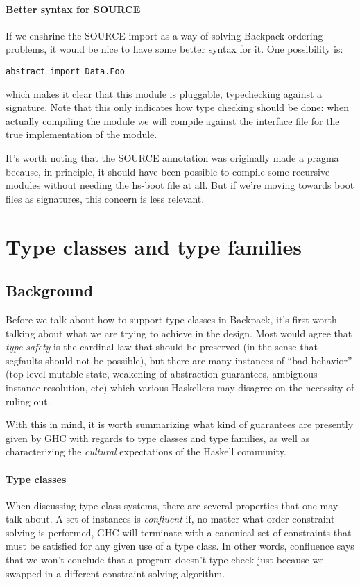 \documentclass{article}
\begin{document}
\paragraph{Better syntax for SOURCE}  If we enshrine the SOURCE import
as a way of solving Backpack ordering problems, it would be nice to have
some better syntax for it. One possibility is:

\begin{verbatim}
abstract import Data.Foo
\end{verbatim}

which makes it clear that this module is pluggable, typechecking against
a signature.  Note that this only indicates how type checking should be
done: when actually compiling the module we will compile against the
interface file for the true implementation of the module.

It's worth noting that the SOURCE annotation was originally made a
pragma because, in principle, it should have been possible to compile
some recursive modules without needing the hs-boot file at all. But if
we're moving towards boot files as signatures, this concern is less
relevant.

\section{Type classes and type families}

\subsection{Background}

Before we talk about how to support type classes in Backpack, it's first
worth talking about what we are trying to achieve in the design.  Most
would agree that \emph{type safety} is the cardinal law that should be
preserved (in the sense that segfaults should not be possible), but
there are many instances of ``bad behavior'' (top level mutable state,
weakening of abstraction guarantees, ambiguous instance resolution, etc)
which various Haskellers may disagree on the necessity of ruling out.

With this in mind, it is worth summarizing what kind of guarantees are
presently given by GHC with regards to type classes and type families,
as well as characterizing the \emph{cultural} expectations of the
Haskell community.

\paragraph{Type classes}  When discussing type class systems, there are
several properties that one may talk about.
A set of instances is \emph{confluent} if, no matter what order
constraint solving is performed, GHC will terminate with a canonical set
of constraints that must be satisfied for any given use of a type class.
In other words, confluence says that we won't conclude that a program
doesn't type check just because we swapped in a different constraint
solving algorithm.
\end{document}
